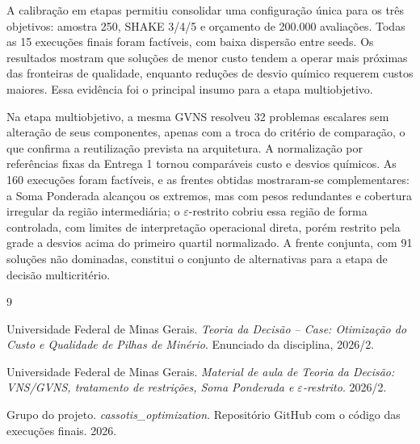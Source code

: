 \documentclass[10pt,twocolumn,a4paper]{article}
\begin{document}
A calibração em etapas permitiu consolidar uma configuração única para os três objetivos: amostra 250, SHAKE 3/4/5 e orçamento de 200.000 avaliações. Todas as 15 execuções finais foram factíveis, com baixa dispersão entre seeds. Os resultados mostram que soluções de menor custo tendem a operar mais próximas das fronteiras de qualidade, enquanto reduções de desvio químico requerem custos maiores. Essa evidência foi o principal insumo para a etapa multiobjetivo.

Na etapa multiobjetivo, a mesma GVNS resolveu 32 problemas escalares sem alteração de seus componentes, apenas com a troca do critério de comparação, o que confirma a reutilização prevista na arquitetura. A normalização por referências fixas da Entrega 1 tornou comparáveis custo e desvios químicos. As 160 execuções foram factíveis, e as frentes obtidas mostraram-se complementares: a Soma Ponderada alcançou os extremos, mas com pesos redundantes e cobertura irregular da região intermediária; o $\varepsilon$-restrito cobriu essa região de forma controlada, com limites de interpretação operacional direta, porém restrito pela grade a desvios acima do primeiro quartil normalizado. A frente conjunta, com 91 soluções não dominadas, constitui o conjunto de alternativas para a etapa de decisão multicritério.

{\small
\begin{thebibliography}{9}

Universidade Federal de Minas Gerais. \textit{Teoria da Decisão -- Case: Otimização do Custo e Qualidade de Pilhas de Minério}. Enunciado da disciplina, 2026/2.

Universidade Federal de Minas Gerais. \textit{Material de aula de Teoria da Decisão: VNS/GVNS, tratamento de restrições, Soma Ponderada e $\varepsilon$-restrito}. 2026/2.

Grupo do projeto. \textit{cassotis\_optimization}. Repositório GitHub com o código das execuções finais. 2026.

\end{thebibliography}
}
\end{document}
